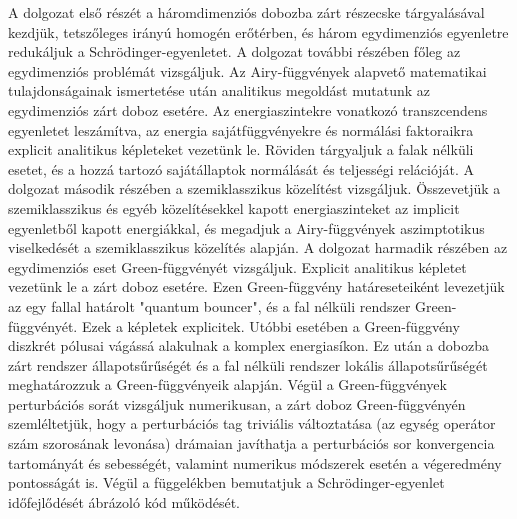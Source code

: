 A dolgozat első részét a háromdimenziós dobozba zárt részecske tárgyalásával kezdjük, tetszőleges irányú homogén erőtérben, és három egydimenziós egyenletre redukáljuk a Schrödinger-egyenletet. A dolgozat további részében főleg az egydimenziós problémát vizsgáljuk. Az Airy-függvények alapvető matematikai tulajdonságainak ismertetése után analitikus megoldást mutatunk az egydimenziós zárt doboz esetére. Az energiaszintekre vonatkozó transzcendens egyenletet leszámítva, az energia sajátfüggvényekre és normálási faktoraikra explicit analitikus képleteket vezetünk le. Röviden tárgyaljuk a falak nélküli esetet, és a hozzá tartozó sajátállaptok normálását és teljességi relációját.
A dolgozat második részében a szemiklasszikus közelítést vizsgáljuk. Összevetjük a szemiklasszikus és egyéb közelítésekkel kapott energiaszinteket az implicit egyenletből kapott energiákkal, és megadjuk a Airy-függvények aszimptotikus viselkedését a szemiklasszikus közelítés alapján.
A dolgozat harmadik részében az egydimenziós eset Green-függvényét vizsgáljuk. Explicit analitikus képletet vezetünk le a zárt doboz esetére. Ezen Green-függvény határeseteiként levezetjük az egy fallal határolt "quantum bouncer", és a fal nélküli rendszer Green-függvényét. Ezek a képletek explicitek. Utóbbi esetében a Green-függvény diszkrét pólusai vágássá alakulnak a komplex energiasíkon. Ez után a dobozba zárt rendszer állapotsűrűségét és a fal nélküli rendszer lokális állapotsűrűségét meghatározzuk a Green-függvényeik alapján. Végül a Green-függvények perturbációs sorát vizsgáljuk numerikusan, a zárt doboz Green-függvényén szemléltetjük, hogy a perturbációs tag triviális változtatása (az egység operátor szám szorosának levonása) drámaian javíthatja a perturbációs sor konvergencia tartományát és sebességét, valamint numerikus módszerek esetén a végeredmény pontosságát is. Végül a függelékben bemutatjuk a Schrödinger-egyenlet időfejlődését ábrázoló kód működését.